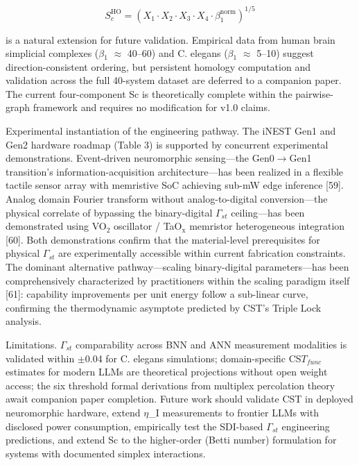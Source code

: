 \documentclass[a4paper,12pt]{article}
\providecommand{\textsubscript}[1]{\ensuremath{_{\text{#1}}}}
\begin{document}
\begin{equation}
S_c^{\text{HO}} = (X_1 \cdot X_2 \cdot X_3 \cdot X_4 \cdot \beta_1^{\text{norm}})^{1/5}
\end{equation}


is a natural extension for future validation. Empirical data from human brain simplicial complexes ($\beta$\textsubscript{1} $\approx$ 40--60) and C. elegans ($\beta$\textsubscript{1} $\approx$ 5--10) suggest direction-consistent ordering, but persistent homology computation and validation across the full 40-system dataset are deferred to a companion paper. The current four-component Sc is theoretically complete within the pairwise-graph framework and requires no modification for v1.0 claims.


Experimental instantiation of the engineering pathway.
The iNEST Gen1 and Gen2 hardware roadmap (Table 3) is supported by concurrent experimental demonstrations.
Event-driven neuromorphic sensing---the Gen0$\rightarrow$Gen1 transition's information-acquisition architecture---has been realized in a flexible tactile sensor array with memristive SoC achieving sub-mW edge inference [59].
Analog domain Fourier transform without analog-to-digital conversion---the physical correlate of bypassing the binary-digital $\Gamma_{st}$ ceiling---has been demonstrated using VO\textsubscript{2} oscillator / TaO\textsubscript{x} memristor heterogeneous integration [60].
Both demonstrations confirm that the material-level prerequisites for physical $\Gamma_{st}$ are experimentally accessible within current fabrication constraints.
The dominant alternative pathway---scaling binary-digital parameters---has been comprehensively characterized by practitioners within the scaling paradigm itself [61]: capability improvements per unit energy follow a sub-linear curve, confirming the thermodynamic asymptote predicted by CST's Triple Lock analysis.


Limitations. $\Gamma_{st}$ comparability across BNN and ANN measurement modalities is validated within $\pm$0.04 for C. elegans simulations; domain-specific CS$T_{func}$ estimates for modern LLMs are theoretical projections without open weight access; the six threshold formal derivations from multiplex percolation theory await companion paper completion.
Future work should validate CST in deployed neuromorphic hardware, extend $\eta$_I measurements to frontier LLMs with disclosed power consumption, empirically test the SDI-based $\Gamma_{st}$ engineering predictions, and extend Sc to the higher-order (Betti number) formulation for systems with documented simplex interactions.
\end{document}

